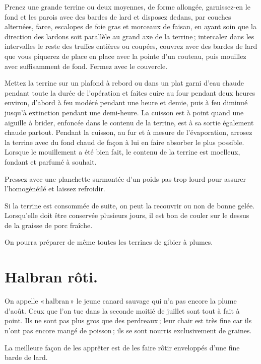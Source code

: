 Prenez une grande terrine ou deux moyennes, de forme allongée, garnissez-en le
fond et les parois avec des bardes de lard et disposez dedans, par couches
alternées, farce, escalopes de foie gras et morceaux de faisan, en ayant soin
que la direction des lardons soit parallèle au grand axe de la terrine ;
intercalez dans les intervalles le reste des truffes entières ou coupées,
couvrez avec des bardes de lard que vous piquerez de place en place avec la
pointe d'un couteau, puis mouillez avec suffisamment de fond. Fermez avec le
couvercle.

Mettez la terrine sur un plafond à rebord ou dans un plat garni d'eau chaude
pendant toute la durée de l'opération et faites cuire au four pendant deux
heures environ, d’abord à feu modéré pendant une heure et demie, puis à feu
diminué jusqu'à extinction pendant une demi-heure. La cuisson est à point quand
une aiguille à brider, enfoncée dans le contenu de la terrine, est à sa sortie
également chaude partout. Pendant la cuisson, au fur et à mesure de
l'évaporation, arrosez la terrine avec du fond chaud de façon à lui en faire
absorber le plus possible. Lorsque le mouillement a été bien fait, le contenu
de la terrine est moelleux, fondant et parfumé à souhait.

Pressez avec une planchette surmontée d’un poids pas trop lourd pour assurer
l'homogénéilé et laissez refroidir.

\sk

Si la terrine est consommée de suite, on peut la recouvrir ou non de bonne
gelée. Lorsqu'elle doit être conservée plusieurs jours, il est bon de couler
sur le dessus de la graisse de porc fraîche.

\sk

On pourra préparer de même toutes les terrines de gibier à plumes.

\section*{\centering Halbran rôti.}
{}

On appelle « halbran » le jeune canard sauvage qui n'a pas encore la plume
d'août. Ceux que l'on tue dans la seconde moitié de juillet sont tout à fait
à point. Ils ne sont pas plus gros que des perdreaux ; leur chair est très fine
car ils n'ont pas encore mangé de poisson ; ils se sont nourris exclusivement
de graines.

La meilleure façon de les apprêter est de les faire rôtir enveloppés d'une fine
barde de lard.

